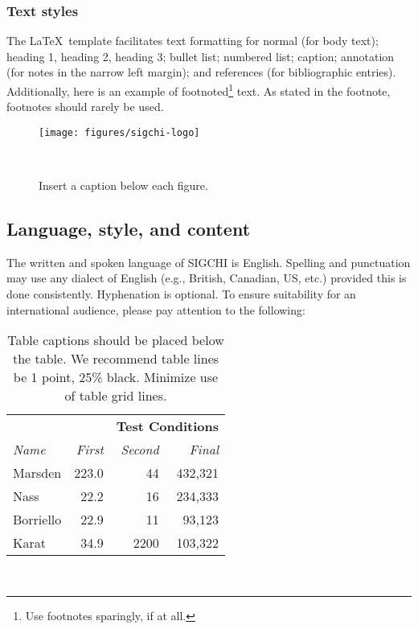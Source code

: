 \documentclass{sigchi-ext}
\begin{document}
\subsubsection{Text styles}
The \LaTeX\ template facilitates text formatting for normal (for body
text); heading 1, heading 2, heading 3; bullet list; numbered list;
caption; annotation (for notes in the narrow left margin); and
references (for bibliographic entries). Additionally, here is an
example of footnoted\footnote{Use footnotes sparingly, if at all.}
text. As stated in the footnote, footnotes should rarely be used.

\begin{figure}
  \texttt{[image: figures/sigchi-logo]}
  \caption{Insert a caption below each figure.}~\label{fig:sample}
\end{figure}

\subsection{Language, style, and content}
The written and spoken language of SIGCHI is English. Spelling and
punctuation may use any dialect of English (e.g., British, Canadian,
US, etc.) provided this is done consistently. Hyphenation is
optional. To ensure suitability for an international audience, please
pay attention to the following:

\begin{table}
  \centering
  \begin{tabular}{l r r r}
    & & \multicolumn{2}{c}{\small{\textbf{Test Conditions}}} \\
    \cmidrule(r){3-4}
    {\small\textit{Name}}
    & {\small \textit{First}}
      & {\small \textit{Second}}
    & {\small \textit{Final}} \\
    \midrule
    Marsden & 223.0 & 44 & 432,321 \\
    Nass & 22.2 & 16 & 234,333 \\
    Borriello & 22.9 & 11 & 93,123 \\
    Karat & 34.9 & 2200 & 103,322 \\
  \end{tabular}
  \caption{Table captions should be placed below the table. We
    recommend table lines be 1 point, 25\% black. Minimize use of
    table grid lines.}~\label{tab:table1}
\end{table}
\end{document}
